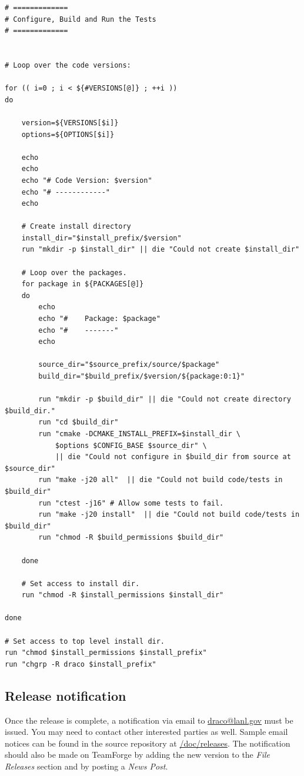 \documentclass[note]{newmemo}
\begin{document}
\begin{lstlisting}[basicstyle=\footnotesize, xleftmargin=0.20in, 
  xrightmargin=0.20in]
# =============
# Configure, Build and Run the Tests
# =============


# Loop over the code versions:

for (( i=0 ; i < ${#VERSIONS[@]} ; ++i ))
do

    version=${VERSIONS[$i]}
    options=${OPTIONS[$i]}

    echo
    echo
    echo "# Code Version: $version"
    echo "# ------------"
    echo

    # Create install directory
    install_dir="$install_prefix/$version"
    run "mkdir -p $install_dir" || die "Could not create $install_dir"

    # Loop over the packages.
    for package in ${PACKAGES[@]}
    do
        echo
        echo "#    Package: $package"
        echo "#    -------"
        echo
        
        source_dir="$source_prefix/source/$package"
        build_dir="$build_prefix/$version/${package:0:1}"

        run "mkdir -p $build_dir" || die "Could not create directory $build_dir."
        run "cd $build_dir"
        run "cmake -DCMAKE_INSTALL_PREFIX=$install_dir \
            $options $CONFIG_BASE $source_dir" \
            || die "Could not configure in $build_dir from source at $source_dir"
        run "make -j20 all"  || die "Could not build code/tests in $build_dir"
        run "ctest -j16" # Allow some tests to fail.
        run "make -j20 install"  || die "Could not build code/tests in $build_dir"
        run "chmod -R $build_permissions $build_dir"

    done

    # Set access to install dir.
    run "chmod -R $install_permissions $install_dir"

done

# Set access to top level install dir.
run "chmod $install_permissions $install_prefix"
run "chgrp -R draco $install_prefix"
\end{lstlisting}


\subsection{Release notification}
\label{sec:release_notification}

Once the release is complete, a notification via email to
\url{draco@lanl.gov} must be issued.  You may need to contact other
interested parties as well.  Sample email notices can be found in the
source repository at \url{/doc/releases}.  The notification should
also be made on TeamForge by adding the new version to the
\textit{File Releases} section and by posting a \textit{News Post}.
\end{document}
